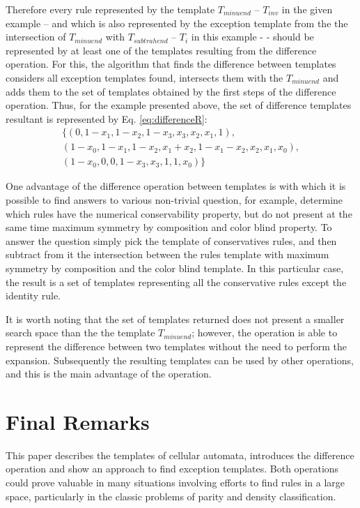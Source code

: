 \documentclass{llncs}
\begin{document}
Therefore every rule represented  by the template $T_{minuend}$ -- $T_{inv}$ in the given example -- and which is also represented by the exception template from the the intersection of $T_{minuend}$ with $T_{subtrahend}$ -- $T_i$ in this example - - should be represented by at least one of the templates resulting from the difference operation. For this, the algorithm that finds the difference between templates considers all exception templates found, intersects them with the $T_{minuend}$ and adds them to the set of templates obtained by the first steps of the difference operation. Thus, for the example presented above, the set of difference templates resultant is represented by Eq. \ref{eq:differenceR}:\begin{equation}
\begin{split}
\{(0, 1 - x_1, 1 - x_2, 1 - x_3, x_3, x_2, x_1, 1), \\
(1 - x_0, 1 - x_1, 1 - x_2, x_1 + x_2, 1 - x_1 - x_2, x_2, x_1, x_0), \\
(1 - x_0, 0, 0, 1 - x_3, x_3, 1, 1, x_0)\}
\label{eq:differenceR}
\end{split}
\end{equation}

One advantage of the difference operation between templates is with which it is possible to find answers to various non-trivial question, for example, determine which rules have the numerical conservability property, but do not present at the same time maximum symmetry by composition and color blind property. To answer the question simply pick the template of conservatives rules, and then subtract from it the intersection between the rules template with maximum symmetry by composition and the color blind template. In this particular case, the result is a set of templates representing all the conservative rules except the identity rule.

It is worth noting that the set of templates returned does not present a smaller search space than the the template $T_{minuend}$; however, the operation is able to represent the difference between two templates without the need to perform the expansion. Subsequently the resulting templates can be used by other operations, and this is the main advantage of the operation.









\section{Final Remarks}
\label{sec:consideracoes_finais}
This paper describes the templates of cellular automata, 
introduces the difference operation and show an approach to find exception templates. Both operations could prove valuable in many situations involving efforts to find rules in a large space, particularly in the classic problems of parity and density classification.
\end{document}
